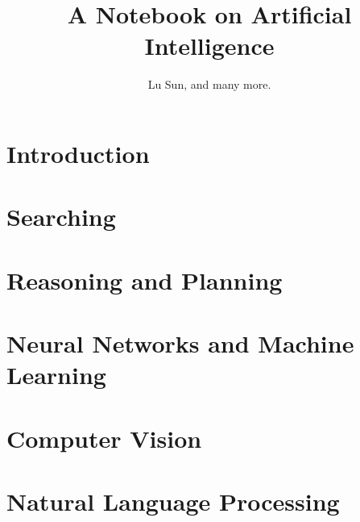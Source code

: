 



\makeindex



\frontmatter

\title{A Notebook on Artificial Intelligence}
\author{Lu Sun, and many more.}

\maketitle


\tableofcontents


\listoffigures
\listoftables

\mainmatter

\part{Introduction}

\part{Searching}

\part{Reasoning and Planning}

\part{Neural Networks and Machine Learning}







\part{Computer Vision}



\part{Natural Language Processing}










\printindex


